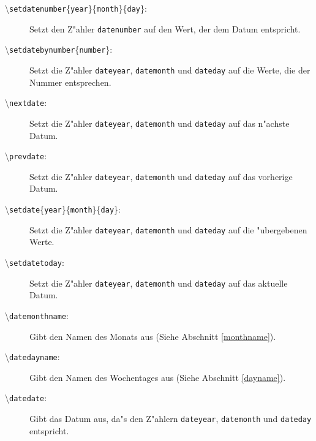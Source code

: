 \documentclass[a4paper,draft]{article}
\begin{document}
\begin{description}
\item[{\mdseries\textbackslash}\texttt{setdatenumber}\{\texttt{year}\}\{\texttt{month}\}\{\texttt{day}\}:] Setzt den Z"ahler \texttt{datenumber} auf den Wert, der dem Datum entspricht.
\item[{\mdseries\textbackslash}\texttt{setdatebynumber}\{\texttt{number}\}:] Setzt die Z"ahler \texttt{dateyear}, \texttt{datemonth} und \texttt{dateday} auf die Werte, die der Nummer entsprechen.
\item[{\mdseries\textbackslash}\texttt{nextdate}:] Setzt die Z"ahler \texttt{dateyear}, \texttt{datemonth} und \texttt{dateday} auf das n"achste Datum.
\item[{\mdseries\textbackslash}\texttt{prevdate}:] Setzt die Z"ahler \texttt{dateyear}, \texttt{datemonth} und \texttt{dateday} auf das vorherige Datum.
\item[{\mdseries\textbackslash}\texttt{setdate}\{\texttt{year}\}\{\texttt{month}\}\{\texttt{day}\}:] Setzt die Z"ahler \texttt{dateyear}, \texttt{datemonth} und \texttt{dateday} auf die "ubergebenen Werte.
\item[{\mdseries\textbackslash}\texttt{setdatetoday}:] Setzt die Z"ahler \texttt{dateyear}, \texttt{datemonth} und \texttt{dateday} auf das aktuelle Datum.
\item[{\mdseries\textbackslash}\texttt{datemonthname}:] Gibt den Namen des Monats aus (Siehe Abschnitt \ref{monthname}).
\item[{\mdseries\textbackslash}\texttt{datedayname}:] Gibt den Namen des Wochentages aus (Siehe Abschnitt \ref{dayname}).
\item[{\mdseries\textbackslash}\texttt{datedate}:] Gibt das Datum aus, da"s den Z"ahlern \texttt{dateyear}, \texttt{datemonth} und \texttt{dateday} entspricht.
\end{description}
\end{document}
